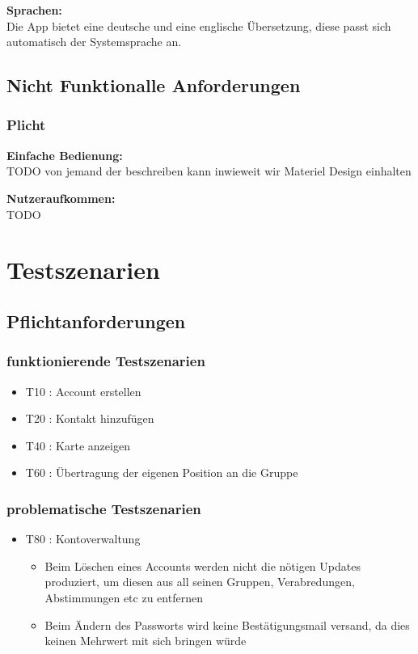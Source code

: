 \documentclass[parskip=full,11pt]{scrartcl}
\begin{document}
\textbf{Sprachen:}\\
Die App bietet eine deutsche und eine englische Übersetzung, diese passt sich
automatisch der Systemsprache an.

\subsection{Nicht Funktionalle Anforderungen}
\subsubsection{Plicht}
\textbf{Einfache Bedienung:}\\
TODO von jemand der beschreiben kann inwieweit wir Materiel Design einhalten

\textbf{Nutzeraufkommen:}\\
TODO

\section{Testszenarien}

\subsection{Pflichtanforderungen}
	\subsubsection{funktionierende Testszenarien}
	\begin{itemize}
		\item T10 : Account erstellen
		\item T20 : Kontakt hinzufügen
		\item T40 : Karte anzeigen
		\item T60 : Übertragung der eigenen Position an die Gruppe
	\end{itemize}

	\subsubsection{problematische Testszenarien}
	\begin{itemize}
		\item T80 : Kontoverwaltung
			\begin{itemize}
			\item Beim Löschen eines Accounts werden nicht die nötigen Updates
			produziert, um diesen aus all seinen Gruppen, Verabredungen, Abstimmungen
			etc zu entfernen
			\item Beim Ändern des Passworts wird keine Bestätigungsmail versand, da
			dies keinen Mehrwert mit sich bringen würde
			\end{itemize}
	\end{itemize}
\end{document}
